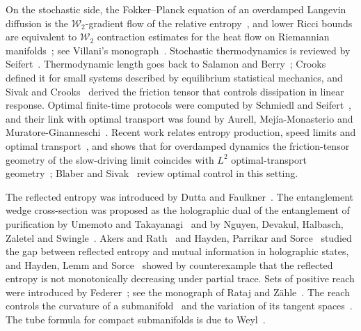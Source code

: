 \documentclass[11pt,a4paper,reqno]{amsart}
\theoremstyle{definition}
\theoremstyle{remark}
\numberwithin{equation}{section}
\begin{document}
On the stochastic side, the Fokker--Planck equation of an overdamped Langevin diffusion is the $\mathcal{W}_2$-gradient flow of the relative entropy~\cite{JordanKinderlehrerOtto1998}, and lower Ricci bounds are equivalent to $\mathcal{W}_2$ contraction estimates for the heat flow on Riemannian manifolds~\cite{vonRenesseSturm2005}; see Villani's monograph~\cite{Villani2009}. Stochastic thermodynamics is reviewed by Seifert~\cite{Seifert2012}. Thermodynamic length goes back to Salamon and Berry~\cite{SalamonBerry1983}; Crooks~\cite{Crooks2007} defined it for small systems described by equilibrium statistical mechanics, and Sivak and Crooks~\cite{SivakCrooks2012} derived the friction tensor that controls dissipation in linear response. Optimal finite-time protocols were computed by Schmiedl and Seifert~\cite{SchmiedlSeifert2007}, and their link with optimal transport was found by Aurell, Mej\'ia-Monasterio and Muratore-Ginanneschi~\cite{Aurell2011}. Recent work relates entropy production, speed limits and optimal transport~\cite{NakazatoIto2021,VanVuSaito2023}, and shows that for overdamped dynamics the friction-tensor geometry of the slow-driving limit coincides with $L^2$ optimal-transport geometry~\cite{ZhongDeWeese2024}; Blaber and Sivak~\cite{BlaberSivak2023} review optimal control in this setting.

The reflected entropy was introduced by Dutta and Faulkner~\cite{DuttaFaulkner2019}. The entanglement wedge cross-section was proposed as the holographic dual of the entanglement of purification by Umemoto and Takayanagi~\cite{UmemotoTakayanagi2018} and by Nguyen, Devakul, Halbasch, Zaletel and Swingle~\cite{NguyenEtAl2018}. Akers and Rath~\cite{AkersRath2020} and Hayden, Parrikar and Sorce~\cite{HaydenParrikarSorce2021} studied the gap between reflected entropy and mutual information in holographic states, and Hayden, Lemm and Sorce~\cite{HaydenLemmSorce2023} showed by counterexample that the reflected entropy is not monotonically decreasing under partial trace. Sets of positive reach were introduced by Federer~\cite{Federer1959}; see the monograph of Rataj and Z\"ahle~\cite{RatajZahle2019}. The reach controls the curvature of a submanifold~\cite{NiyogiSmaleWeinberger2008,Aamari2019} and the variation of its tangent spaces~\cite{BoissonnatLieutierWintraecken2019}. The tube formula for compact submanifolds is due to Weyl~\cite{Weyl1939}.

\end{document}
